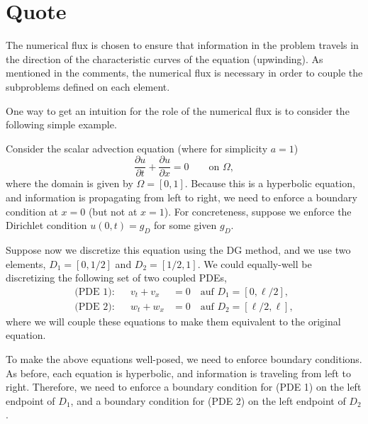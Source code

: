 %
%
%
\section{Quote}
The numerical flux is chosen to ensure that information in the problem travels in the direction of the characteristic curves of the equation (upwinding). As mentioned in the comments, the numerical flux is necessary in order to couple the subproblems defined on each element.

One way to get an intuition for the role of the numerical flux is to consider the following simple example.

Consider the scalar advection equation (where for simplicity $a=1$)
$$
\frac{\partial u}{\partial t} + \frac{\partial u}{\partial x} = 0 \qquad\text{on $\Omega$},
$$
where the domain is given by $\Omega = [0,1]$. Because this is a hyperbolic equation, and information is propagating from left to right, we need to enforce a boundary condition at $x = 0$ (but not at $x = 1$). For concreteness, suppose we enforce the Dirichlet condition $u(0,t) = g_D$ for some given $g_D$.

Suppose now we discretize this equation using the DG method, and we use two elements, $D_1 = [0,1/2]$ and $D_2 = [1/2,1]$. We could equally-well be discretizing the following set of two coupled PDEs,
\begin{align*}
\text{(PDE 1):} && v_t + v_x &= 0 \quad\text{auf $D_1=[0,\ell/2]$},\\
\text{(PDE 2):} && w_t + w_x &= 0 \quad\text{auf $D_2=[\ell/2,\ell]$},
\end{align*}
where we will couple these equations to make them equivalent to the original equation.

To make the above equations well-posed, we need to enforce boundary conditions. As before, each equation is hyperbolic, and information is traveling from left to right. Therefore, we need to enforce a boundary condition for (PDE 1) on the left endpoint of $D_1$, and a boundary condition for (PDE 2) on the left endpoint of $D_2$.

